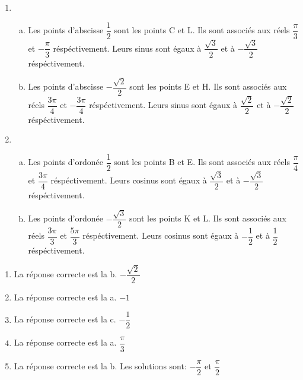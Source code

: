 \documentclass[12pt]{book}
\begin{document}
\begin{Exercise}[number={61}]
    \begin{enumerate}
        \item   \begin{enumerate}[a)]
                \item Les points d'abscisse $\dfrac{1}{2}$ sont les points C et L. Ils sont associés aux réels $\dfrac{\pi}{3}$ et $-\dfrac{\pi}{3}$ réspéctivement. Leurs sinus sont égaux à $\dfrac{\sqrt{3}}{2}$ et à $-\dfrac{\sqrt{3}}{2}$ réspéctivement.
                \item Les points d'abscisse $-\dfrac{\sqrt{2}}{2}$ sont les points E et H. Ils sont associés aux réels $\dfrac{3\pi}{4}$ et $-\dfrac{3\pi}{4}$ réspéctivement. Leurs sinus sont égaux à $\dfrac{\sqrt{2}}{2}$ et à $-\dfrac{\sqrt{2}}{2}$ réspéctivement.
                \end{enumerate}
        \item   \begin{enumerate}[a)]
                \item Les points d'ordonée $\dfrac{1}{2}$ sont les points B et E. Ils sont associés aux réels $\dfrac{\pi}{4}$ et $\dfrac{3\pi}{4}$ réspéctivement. Leurs cosinus sont égaux à $\dfrac{\sqrt{3}}{2}$ et à $-\dfrac{\sqrt{3}}{2}$ réspéctivement.
                \item Les points d'ordonée $-\dfrac{\sqrt{3}}{2}$ sont les points K et L. Ils sont associés aux réels $\dfrac{3\pi}{3}$ et $\dfrac{5\pi}{3}$ réspéctivement. Leurs cosinus sont égaux à $-\dfrac{1}{2}$ et à $\dfrac{1}{2}$ réspéctivement.
                \end{enumerate}
    \end{enumerate}
\end{Exercise}

\begin{Exercise}[number={63}]
    \begin{enumerate}
        \item La réponse correcte est la b. $-\dfrac{\sqrt{2}}{2}$
        \item La réponse correcte est la a. $-1$
        \item La réponse correcte est la c. $-\dfrac{1}{2}$
        \item La réponse correcte est la a. $\dfrac{\pi}{3}$
        \item La réponse correcte est la b. Les solutions sont: $-\dfrac{\pi}{2}$ et $\dfrac{\pi}{2}$
    \end{enumerate}    
\end{Exercise}
\end{document}
